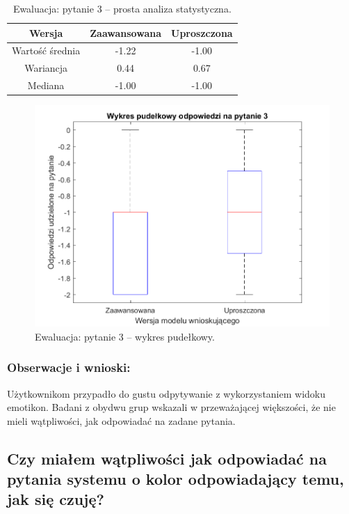 	\begin{table}[!h]
		\caption{Ewaluacja: pytanie 3 -- prosta analiza statystyczna.}
		\centering
		\begin{tabular}{|c|c|c|}
			\hline
			Wersja          & Zaawansowana & Uproszczona \\ \hline
			Wartość średnia & -1.22        & -1.00       \\ \hline
			Wariancja       &  0.44        &  0.67       \\ \hline
			Mediana         & -1.00        & -1.00       \\ \hline
		\end{tabular}
	\end{table}
	\clearpage
	
	\begin{figure}[H]
		\centering
		\includegraphics[scale=0.8]{rozdzial5/Ewaluacja3.png}
		\caption{Ewaluacja: pytanie 3 -- wykres pudełkowy.}
	\end{figure}
	
	\subsubsection{Obserwacje i wnioski:}
	
	Użytkownikom przypadło do gustu odpytywanie z wykorzystaniem widoku emotikon. Badani z obydwu grup wskazali w przeważającej większości, że nie mieli wątpliwości, jak odpowiadać na zadane pytania.
	
	
	\subsection{Czy miałem wątpliwości jak odpowiadać na pytania systemu o kolor odpowiadający temu, jak się czuję?}
	
